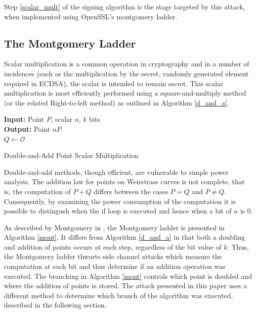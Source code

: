 \documentclass{llncs}
\begin{document}
Step \ref{scalar_mult} of the signing algorithm is the stage targeted by this attack, when implemented using OpenSSL's montgomery ladder. %

\subsection{The Montgomery Ladder}\label{sub:montgomery}
Scalar multiplication is a common operation in cryptography and in a number of incidences (such as the multiplication by the secret, randomly generated element required in ECDSA), the scalar is intended to remain secret. This scalar multiplication is most efficiently performed using a square-and-multiply method (or the related Right-to-left method) as outlined in Algorithm \ref{d_and_a}.\\

\vspace{-0.8cm}
\begin{algorithm}[htb]\label{d_and_a}
\SetAlgoLined
{\bf Input:} Point $P$, scalar $n$, $k$ bits\\
{\bf Output:} Point $nP$\\
$Q\gets \mathcal{O}$\\
 \caption{Double-and-Add Point Scalar Multiplication}
\end{algorithm}\vspace{-0.5cm}
Double-and-add methods, though efficient, are vulnerable to simple power analysis. The addition law for points on Weirstrass curves is not complete, that is, the computation of $P+Q$ differs between the cases $P=Q$ and $P\neq Q.$ Consequently, by examining the power consumption of the computation it is possible to distingush when the if loop is executed and hence when a bit of $n$ is 0.

As described by Montgomery in \cite{montgomery87speeding}, the Montgomery ladder is presented in Algorithm \ref{mont}. It differs from Algorithm \ref{d_and_a} in that both a doubling and addition of points occurs at each step, regardless of the bit value of $k$. Thus, the Montgomery ladder thwarts side channel attacks which measure the computation at each bit and thus determine if an addition operation was executed. The branching in Algorithm \ref{mont} controls which point is doubled and where the addition of points is stored. The attack presented in this paper uses a different method to determine which branch of the algorithm was executed, described in the following section.
\end{document}
